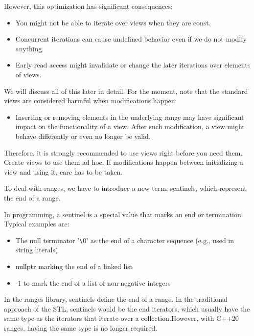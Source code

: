 However, this optimization has significant consequences:

\begin{itemize}
\item
You might not be able to iterate over views when they are const.

\item
Concurrent iterations can cause undefined behavior even if we do not modify anything.

\item
Early read access might invalidate or change the later iterations over elements of views.
\end{itemize}

We will discuss all of this later in detail. For the moment, note that the standard views are considered harmful when modifications happen:

\begin{itemize}
\item
Inserting or removing elements in the underlying range may have significant impact on the functionality of a view. After such modification, a view might behave differently or even no longer be valid.
\end{itemize}

Therefore, it is strongly recommended to use views right before you need them. Create views to use them ad hoc. If modifications happen between initializing a view and using it, care has to be taken.


To deal with ranges, we have to introduce a new term, sentinels, which represent the end of a range.

In programming, a sentinel is a special value that marks an end or termination. Typical examples are:

\begin{itemize}
\item
The null terminator ’\verb|\|0’ as the end of a character sequence (e.g., used in string literals)

\item
nullptr marking the end of a linked list

\item
-1 to mark the end of a list of non-negative integers
\end{itemize}

In the ranges library, sentinels define the end of a range. In the traditional approach of the STL, sentinels would be the end iterators, which usually have the same type as the iterators that iterate over a collection.However, with C++20 ranges, having the same type is no longer required.

